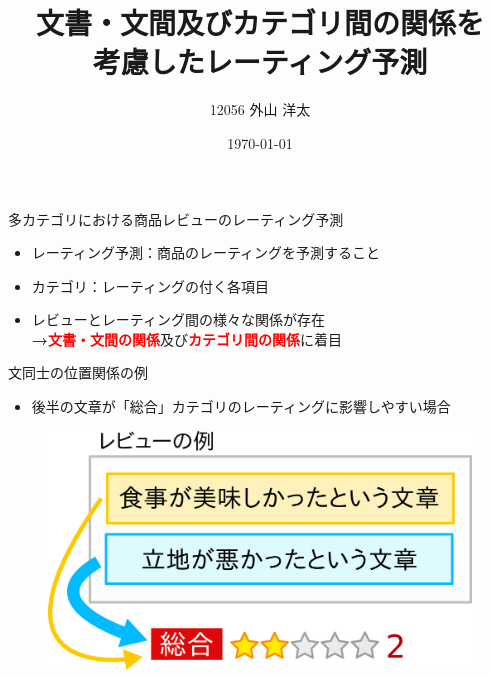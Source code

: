 \documentclass[aspectratio=43,unicode,10pt]{beamer}
\title{文書・文間及びカテゴリ間の関係を\\考慮したレーティング予測}
\institute{知能数理研究室}
\author{12056 外山 洋太}
\date{\today}
\newcommand{\fire}[1]{\textcolor{red}{\textbf{#1}}}
\newcommand{\arrow}{\textcolor{ttiblue}{\textbf{→}}\hspace{1ex}}
\begin{document}
\begin{frame}
\titlepage
\end{frame}

\begin{frame}{多カテゴリにおける商品レビューのレーティング予測}{}
  \begin{itemize}
    \item レーティング予測：商品のレーティングを予測すること
    \item カテゴリ：レーティングの付く各項目
    \item レビューとレーティング間の様々な関係が存在 \\
          \arrow \fire{文書・文間の関係}及び\fire{カテゴリ間の関係}に着目
  \end{itemize}
  \begin{figure}
    \fboxsep=2mm
  \end{figure}
\end{frame}

\begin{frame}{文同士の位置関係の例}{}
  \begin{itemize}
    \item 後半の文章が「総合」カテゴリのレーティングに影響しやすい場合
  \end{itemize}
  \begin{figure}
    \includegraphics[width=0.8\linewidth]
                    {fig/global_relations_among_sentences.png}
  \end{figure}
\end{frame}
\end{document}
